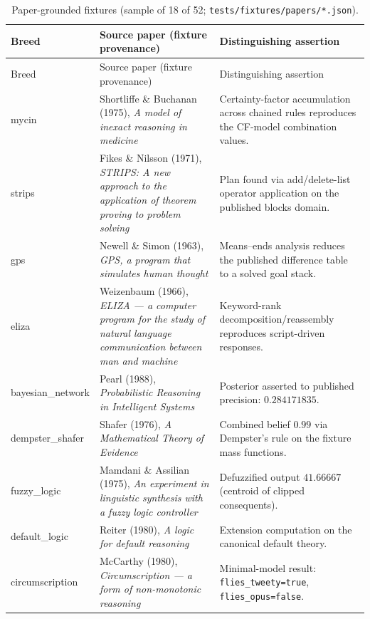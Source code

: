 \documentclass[11pt,oneside]{report}
\begin{document}
\begin{small}
\begin{longtable}{p{2.5cm}p{6.2cm}p{4.9cm}}
\caption{Paper-grounded fixtures (sample of 18 of 52;
\texttt{tests/fixtures/papers/*.json}).}
\label{tab:papers}\\
\toprule
Breed & Source paper (fixture provenance) & Distinguishing assertion \\
\midrule
\endfirsthead
\toprule
Breed & Source paper (fixture provenance) & Distinguishing assertion \\
\midrule
\endhead
\bottomrule
\endfoot
mycin & Shortliffe \& Buchanan (1975), \emph{A model of inexact reasoning in medicine} \cite{shortliffe1975} & Certainty-factor accumulation across chained rules reproduces the CF-model combination values. \\
strips & Fikes \& Nilsson (1971), \emph{STRIPS: A new approach to the application of theorem proving to problem solving} \cite{fikes1971} & Plan found via add/delete-list operator application on the published blocks domain. \\
gps & Newell \& Simon (1963), \emph{GPS, a program that simulates human thought} \cite{newell1963} & Means--ends analysis reduces the published difference table to a solved goal stack. \\
eliza & Weizenbaum (1966), \emph{ELIZA --- a computer program for the study of natural language communication between man and machine} \cite{weizenbaum1966} & Keyword-rank decomposition/reassembly reproduces script-driven responses. \\
bayesian\_network & Pearl (1988), \emph{Probabilistic Reasoning in Intelligent Systems} \cite{pearl1988} & Posterior asserted to published precision: $0.284171835$. \\
dempster\_shafer & Shafer (1976), \emph{A Mathematical Theory of Evidence} \cite{shafer1976} & Combined belief $0.99$ via Dempster's rule on the fixture mass functions. \\
fuzzy\_logic & Mamdani \& Assilian (1975), \emph{An experiment in linguistic synthesis with a fuzzy logic controller} \cite{mamdani1975} & Defuzzified output $41.66667$ (centroid of clipped consequents). \\
default\_logic & Reiter (1980), \emph{A logic for default reasoning} \cite{reiter1980} & Extension computation on the canonical default theory. \\
circumscription & McCarthy (1980), \emph{Circumscription --- a form of non-monotonic reasoning} \cite{mccarthy1980} & Minimal-model result: \texttt{flies\_tweety=true}, \texttt{flies\_opus=false}. \\

\end{longtable}
\end{small}
\end{document}
